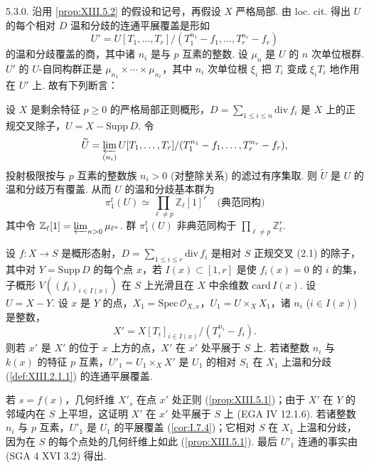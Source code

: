 5.3.0. 沿用 \ref{prop:XIII.5.2} 的假设和记号，再假设 $X$ 严格局部. 由 loc. cit. 得出 $U$ 的每个相对 $D$ 温和分歧的连通平展覆盖是形如
\[
U' = U[T_1, \ldots, T_r]/(T_1^{n_1} - f_1, \ldots, T_r^{n_r} - f_r)
\]
的温和分歧覆盖的商，其中诸 $n_i$ 是与 $p$ 互素的整数. 设 $\mu_n$ 是 $U$ 的 $n$ 次单位根群. $U'$ 的 $U$-自同构群正是 $\mu_{n_1} \times \cdots \times \mu_{n_r}$，其中 $n_i$ 次单位根 $\xi_i$ 把 $T_i$ 变成 $\xi_i T_i$ 地作用在 $U'$ 上. 故有下列断言：

\begin{corollary}\label{cor:XIII.5.3}
设 $X$ 是剩余特征 $p \geqslant 0$ 的严格局部正则概形，$D = \sum_{1 \leqslant i \leqslant n} \mathrm{div}\, f_i$ 是 $X$ 上的正规交叉除子，$U = X - \mathrm{Supp}\, D$. 令
\[
\widetilde{U} = \varprojlim_{(n_i)} U[T_1, \ldots, T_r]/(T_1^{n_1} - f_1, \ldots, T_r^{n_r} - f_r),
\]
投射极限按与 $p$ 互素的整数族 $n_i > 0$ (对整除关系) 的滤过有序集取. 则 $\widetilde{U}$ 是 $U$ 的温和分歧万有覆盖. 从而 $U$ 的温和分歧基本群为
\[
\pi^t_1(U) \simeq \prod_{\ell \neq p} \mathbb{Z}_\ell[1]^r \quad \text{(典范同构)}
\]
其中令 $\mathbb{Z}_\ell[1] = \varprojlim_{n > 0} \mu_{\ell^n}$. 群 $\pi^t_1(U)$ 非典范同构于 $\prod_{\ell \neq p} \mathbb{Z}_\ell^r$.
\end{corollary}

\begin{proposition}\label{prop:XIII.5.4}
设 $f \colon X \to S$ 是概形态射，$D = \sum_{1 \leqslant i \leqslant r} \mathrm{div}\, f_i$ 是相对 $S$ 正规交叉 (2.1) 的除子，其中对 $Y = \mathrm{Supp}\, D$ 的每个点 $x$，若 $I(x) \subset [1, r]$ 是使 $f_i(x) = 0$ 的 $i$ 的集，子概形 $V((f_i)_{i \in I(x)})$ 在 $S$ 上光滑且在 $X$ 中余维数 $\mathrm{card}\, I(x)$. 设 $U = X - Y$. 设 $x$ 是 $Y$ 的点，$X_1 = \mathrm{Spec}\, \mathcal{O}_{X, x}$，$U_1 = U \times_X X_1$，诸 $n_i$ ($i \in I(x)$) 是整数，
\[
X' = X[T_i]_{i \in I(x)}/(T_i^{n_i} - f_i).
\]
则若 $x'$ 是 $X'$ 的位于 $x$ 上方的点，$X'$ 在 $x'$ 处平展于 $S$ 上. 若诸整数 $n_i$ 与 $k(x)$ 的特征 $p$ 互素，$U'_1 = U_1 \times_X X'$ 是 $U_1$ 的相对 $S_1$ 在 $X_1$ 上温和分歧 (\cref{def:XIII.2.1.1}) 的连通平展覆盖.
\end{proposition}

若 $s = f(x)$，几何纤维 $X'_s$ 在点 $x'$ 处正则 (\cref{prop:XIII.5.1})；由于 $X'$ 在 $Y$ 的邻域内在 $S$ 上平坦，这证明 $X'$ 在 $x'$ 处平展于 $S$ 上 (EGA IV 12.1.6). 若诸整数 $n_i$ 与 $p$ 互素，$U'_1$ 是 $U_1$ 的平展覆盖 (\cref{cor:I.7.4})；它相对 $S$ 在 $X_1$ 上温和分歧，因为在 $S$ 的每个点处的几何纤维上如此 (\cref{prop:XIII.5.1}). 最后 $U'_1$ 连通的事实由 (SGA 4 XVI 3.2) 得出.


